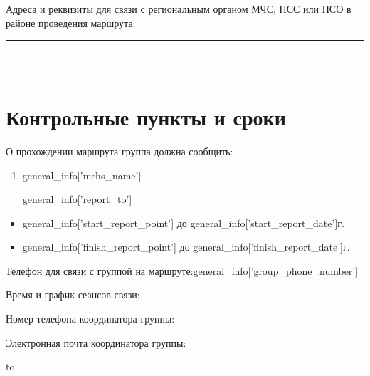 \documentclass[a5paper, 12pt, twoside]{article}
\begin{document}
        Адреса и реквизиты для связи с региональным органом МЧС, ПСС или ПСО в районе проведения маршрута:%
        \;\leaders\hrule height 0.2pt\hfill\strut
        \vspace{0.2cm}

        \,\leaders\hrule height 0.2pt\hfill\strut
        \vspace{0.2cm}

\newpage %

    \section{Контрольные пункты и сроки}

        О прохождении маршрута группа должна сообщить:

        \begin{enumerate}[itemsep=1pt]
            \item \parbox[t]{0.58\textwidth}{%
            {{general_info['mchs_name']}}} \hfil \parbox[t]{0.325\textwidth}{}
            {{general_info['report_to']}}
        \end{enumerate}

        \begin{itemize}[label=из, noitemsep]
            \item {{general_info['start_report_point']}} до {{general_info['start_report_date']}}\;г.
            \item {{general_info['finish_report_point']}} до {{general_info['finish_report_date']}}\;г.
        \end{itemize}

        Телефон для связи с группой на маршруте:\hfill{{general_info['group_phone_number']}}

        Время и график сеансов связи:\;\hrulefill

        Номер телефона координатора группы:\;\hrulefill

        Электронная почта координатора группы:\;\hrulefill
        \vspace{0.4cm}

        \hbox to 
        \vspace{0.4cm}
\end{document}
